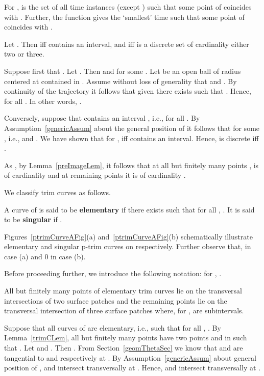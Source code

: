 \documentclass{elsart5p}
\begin{document}
For ,  is the set of all time instances  (except ) such 
that some point of  coincides with . 
Further, the function  gives the `smallest' 
time  such that some point of  coincides with .

\begin{lem} \label{trimCLem}
Let . Then   iff  contains an interval, and  iff  is a discrete set
of cardinality either two or three.
\end{lem}
 Suppose first that .  Let .  Then  and 
 for some .  Let  be an open ball of radius  centered at 
 contained in .  Assume without loss of generality that  and . 
By continuity of the trajectory  it follows that given  there exists  such that 
.  Hence,  for all 
.  In other words, .

Conversely, suppose that  contains an interval , i.e.,  for all 
.  By Assumption~\ref{genericAssum} about the general position of  it 
follows that  for some , i.e.,  and .
We have shown that for ,  iff  contains an interval.  Hence,  is discrete iff . 

As , 
by Lemma~\ref{preImageLem}, it follows that 
at all but finitely many points ,  
 is of cardinality  and at remaining points it is of cardinality . 
\hfill 


We classify trim curves as follows.
\begin{defn} \label{trimCClassifyDef}
A curve  of  is said to be {\bf elementary} if  there exists  such that for all 
, . 
It is said to be {\bf singular} if .
\end{defn}

Figures~\ref{ptrimCurveAFig}(a) and~\ref{ptrimCurveAFig}(b) schematically illustrate elementary and singular p-trim curves on  respectively.  
Further observe that,  in case (a) and 0 in case (b).

Before proceeding further, we introduce the following notation: for 
, .

\begin{lem} \label{transInterLem}
All but finitely many points of elementary trim curves lie on the 
transversal intersections of two surface 
patches  and the remaining points lie on the transversal 
intersection of three surface patches  
where, for ,  are subintervals.
\end{lem}
  Suppose that all curves of  are elementary, i.e.,  
such that for all , .
By Lemma~\ref{trimCLem}, 
all but finitely many points  have two points  and 
 in  such that 
.  Let  
and  .  Then 
.  From Section~\ref{geomThetaSec} we know that 
 and  are tangential to  and  
respectively at .  By Assumption~\ref{genericAssum} about general position of ,  and 
 intersect transversally at .  Hence,  and  intersect 
transversally at .  
\end{document}
